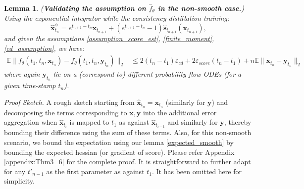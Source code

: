 \documentclass[11pt]{article}
\def\rvx{{\mathbf{x}}}
\def\rvy{{\mathbf{y}}}
\def\vs{{\bm{s}}}
\def\vx{{\bm{x}}}
\def\vy{{\bm{y}}}
\newtheorem{lemma}{Lemma}[section]
\begin{document}
\begin{lemma}
\label{lemma_non_smooth_cf_lipschitz}
{(\textbf{Validating the assumption on $\hat{f}_\theta$ in the non-smooth case.})
Using the exponential integrator while the consistency distillation training:
\[
\hat{\vx}^\phi_{t_n} = e^{t_{n+1}-t_n} \rvx_{t_{n+1}} + (e^{t_{n+1}-t_n} - 1) \hat{\vs}_{t_{n+1}}(\rvx_{t_{n+1}}),
\]
and given the assumptions \ref{assumption_score_est}, \ref{finite_moment}, \ref{cd_assumption},  
we have:
\begin{align*}
\mathbb{E}\|f_\theta(t_1, t_n, \rvx_{t_n}) - f_\theta(t_1, t_n, \rvy_{t_n})\|_2 
& \leq 2(t_n-t_1)\varepsilon_{cd} + 2\varepsilon_{score}(t_n-t_1)  + n\mathbb{E}\|\rvx_{t_n}-\rvy_{t_n}\|_2 
\end{align*}
}
\noindent
where again $\vy_{t_n}$ lie on a (correspond to) different probability flow ODEs (for a given time-stamp $t_n$).
\end{lemma}
\textit{Proof Sketch.} A rough sketch starting from $\hat{\rvx}_{t_n}={\rvx}_{t_n}$ (similarly for ${\rvy}$) and decomposing the terms corresponding to $\rvx, \rvy$ into the additional error aggregation when ${\hat{\rvx}}_{t_{i}}$ is mapped to $t_1$ as against $\hat{\rvx}_{t_{i-1}}$ and similarly for $\rvy$, thereby bounding their difference using the sum of these terms.
Also, for this non-smooth scenario, we bound the expectation using our lemma \ref{expected_smooth} by bounding the expected hessian (or gradient of score). Please refer Appendix \ref{appendix:Thm3_6} for the complete proof. It is straightforward to further adapt for any $t'_{n-1}$ as the first parameter as against $t_1$. It has been omitted here for simplicity.
\end{document}
